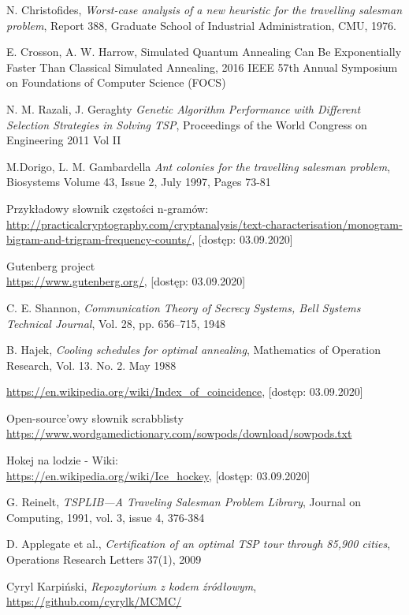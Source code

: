 \documentclass[a4paper]{article}
\theoremstyle{defn}
\theoremstyle{theorem}
\theoremstyle{lemma}
\theoremstyle{cor}
\theoremstyle{fact}
\begin{document}
\begin{thebibliography}{9}
  N. Christofides, \emph{Worst-case analysis of a new heuristic for the travelling salesman problem}, Report 388, Graduate School of Industrial Administration, CMU, 1976.
  
E. Crosson, A. W. Harrow, {Simulated Quantum Annealing Can Be Exponentially Faster Than Classical Simulated Annealing},
2016 IEEE 57th Annual Symposium on Foundations of Computer Science (FOCS)


N. M. Razali, J. Geraghty \emph{Genetic Algorithm Performance with Different
Selection Strategies in Solving TSP},
Proceedings of the World Congress on Engineering 2011 Vol II 

M.Dorigo, L. M. Gambardella \emph{Ant colonies for the travelling salesman problem}, Biosystems
Volume 43, Issue 2, July 1997, Pages 73-81


Przykładowy słownik częstości n-gramów:\\
\href{http://practicalcryptography.com/cryptanalysis/text-characterisation/monogram-bigram-and-trigram-frequency-counts/}{http://practicalcryptography.com/cryptanalysis/text-characterisation/monogram-bigram-and-trigram-frequency-counts/}, [dostęp: 03.09.2020]

Gutenberg project\\
\href{https://www.gutenberg.org/}{https://www.gutenberg.org/}, [dostęp: 03.09.2020]

C. E. Shannon, \emph{Communication Theory of Secrecy Systems, Bell Systems Technical Journal}, Vol. 28, pp. 656–715, 1948

B. Hajek, \emph{Cooling schedules for optimal annealing},
Mathematics of Operation Research, Vol. 13. No. 2. May 1988

\href{https://en.wikipedia.org/wiki/Index\_of\_coincidence}{https://en.wikipedia.org/wiki/Index\_of\_coincidence}, [dostęp: 03.09.2020]

Open-source'owy słownik scrabblisty\\
\href{https://www.wordgamedictionary.com/sowpods/download/sowpods.txt}{https://www.wordgamedictionary.com/sowpods/download/sowpods.txt}

Hokej na lodzie - Wiki:\\
\href{https://en.wikipedia.org/wiki/Ice\_hockey}{https://en.wikipedia.org/wiki/Ice\_hockey}, [dostęp: 03.09.2020]

G. Reinelt, \emph{TSPLIB—A Traveling Salesman Problem Library}, Journal on Computing, 1991, vol. 3, issue 4, 376-384

D. Applegate  et al.,  \emph{Certification of an optimal TSP tour through 85,900 cities}, Operations Research Letters 37(1), 2009

Cyryl Karpiński,
\textit{Repozytorium z kodem źródłowym}, 
\href{https://github.com/cyrylk/MCMC/}{https://github.com/cyrylk/MCMC/}

\end{thebibliography}
\end{document}
